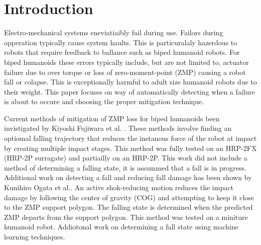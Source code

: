 \section{Introduction}
Electro-mechanical systems eneviatiaibly fail during use.  Failors during opperation typically cause system haults.  This is particuralaly hazerdous to robots that require feedback to ballance such as biped humanoid robots.  For biped humanoids these errors typically include, but are not limited to, actuator failure due to over torque or loss of zero-moment-point (ZMP) \cite{zmp35} causing a robot fall or colapse.  This is exceptionally harmful to adult size humanoid robots due to their weight.  This paper focuses on way of automatically detecting when a failure is about to occure and choosing the proper mitigation technique. 

Current methods of mitigation of ZMP loss for biped humanoids been invistigated by Kiyoshi Fujiwara et al. \cite{4115653}.  These methods involve finding an optiomal falling trajectory that reduces the instanous force of the robot at impact by creating multiple impact stages\cite{4399327}.  This method was fully tested on an HRP-2FX (HRP-2P surragate) and partiailly on an HRP-2P.  This work did not include a method of determining a falling state, it is assummed that a fall is in progress.  Additional work on detecting a fall and reducing fall damage has been shown by Kunihiro Ogata et al.\cite{4755950}.  An active shok-reducing motion reduces the impact damage by following the center of gravity (COG) and attempting to keep it close to the ZMP support polygon.  The falling state is determined when the predicted ZMP departs from the support polygon. This method was tested on a miniture humanoid robot.  Addiotonal work on determining a fall state using machine learning techniques\cite{4813885}.